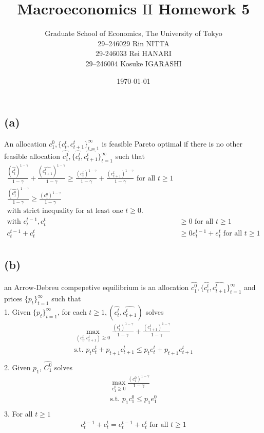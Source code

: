 \documentclass{ltjsarticle}
\title{Macroeconomics $\mathrm{II}$ Homework 5}
\date{\today}
\author{Graduate School of Economics, The University of Tokyo\\[4mm]29--246029 Rin NITTA\\ 29-246033 Rei HANARI \\ 29--246004 Kosuke IGARASHI}
\begin{document}
\maketitle

\section{} %
\subsection*{(a)}
An allocation $c_1^0, \{ c_t^t, c_{t+1}^t \}_{t=1}^\infty$ is feasible Pareto optimal if there is no other feasible allocation $\hat{c_1^0}, \{ \hat{c_t^t}, \hat{c_{t+1}^t} \}_{t=1}^\infty$ such that\\
\begin{align*}
  \frac{(\hat{c_t^t})^{1 - \gamma}}{1 - \gamma} + \frac{(\hat{c_{t+1}^t})^{1 - \gamma}}{1 - \gamma} \geq \frac{(c_t^t)^{1 - \gamma}}{1 - \gamma} + \frac{(c_{t+1}^t)^{1 - \gamma}}{1 - \gamma} \text{ for all } t \geq 1\\
  \frac{(\hat{c_1^0})^{1 - \gamma}}{1 - \gamma} \geq \frac{(c_1^0)^{1 - \gamma}}{1 - \gamma}\\
  \text{with strict inequality for at least one }t \geq 0.\\
  \text{with }c_t^{t-1}, c_t^t &\geq 0 \text{ for all } t \geq 1\\
  c_t^{t-1} + c_t^t &\geq 0 e_t^{t-1} + e_t^t \text{ for all } t \geq 1\\ 
\end{align*}

\subsection*{(b)}
an Arrow-Debreu compepetive equilibrium is an allocation $\hat{c_1^0}, \{ \hat{c_t^t}, \hat{c_{t+1}^t} \}_{t=1}^\infty$ and prices $\{ p_t \}_{t=1}^\infty$ such that\\
1. Given $\{ p_t \}_{t=1}^\infty$, for each $t \geq 1, (\hat{c_t^t}, \hat{c_{t+1}^t})$ solves\\
\begin{align*}
  \max_{(c_t^t, c_{t+1}^t) \geq 0} \frac{(c_t^t)^{1 - \gamma}}{1 - \gamma} + \frac{(c_{t+1}^t)^{1 - \gamma}}{1 - \gamma}\\
  \text{s.t. } p_t c_t^t + p_{t+1} c_{t+1}^t \leq p_t e_t^t + p_{t+1} e_{t+1}^t\\
\end{align*}
2. Given $p_1$, $\hat{C_1^0}$ solves\\
\begin{align*}
  \max_{c_1^0 \geq 0} \frac{(c_1^0)^{1 - \gamma}}{1 - \gamma}\\
  \text{s.t. } p_1 c_1^0 \leq p_1 e_1^0\\
\end{align*}
3. For all $t \geq 1$\\
\begin{align*}
  c_t^{t-1} + c_t^t = e_t^{t-1} + e_t^t \text{ for all } t \geq 1\\
\end{align*}
\end{document}
